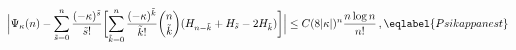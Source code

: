 \begin{equation}
\Big|\Psi_\kappa(n) - \sum_{\tilde s=0}^n 
\frac{(-\kappa)^{\tilde s}}{\tilde s!} \biggl[
\sum_{\tilde k=0}^{n} 
\frac{(-\kappa)^{\tilde k}}{\tilde k!} \binom{n}{\tilde k}
(H_{n-\tilde k}+H_{\tilde s}-2 H_{\tilde k}) \biggr]\Big|
\leq C (8|\kappa|)^n  \frac{n\log n }{n!}  \,,
\eqlabel{Psikappanest}
\end{equation}


